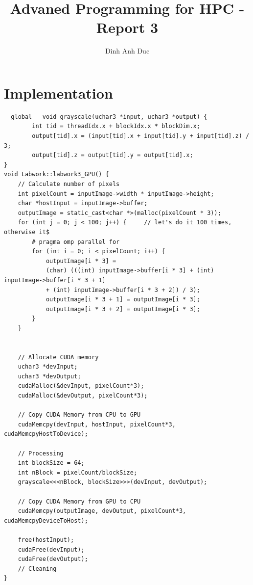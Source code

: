 \documentclass{article}
\title{Advaned Programming for HPC - Report 3}
\author{Dinh Anh Duc}
\begin{document}
\maketitle

\section*{Implementation}
\begin{lstlisting}
__global__ void grayscale(uchar3 *input, uchar3 *output) {
        int tid = threadIdx.x + blockIdx.x * blockDim.x;
        output[tid].x = (input[tid].x + input[tid].y + input[tid].z) / 3;
        output[tid].z = output[tid].y = output[tid].x;
}
void Labwork::labwork3_GPU() {
    // Calculate number of pixels
    int pixelCount = inputImage->width * inputImage->height;
    char *hostInput = inputImage->buffer;
    outputImage = static_cast<char *>(malloc(pixelCount * 3));
    for (int j = 0; j < 100; j++) {     // let's do it 100 times, otherwise it$
        # pragma omp parallel for
        for (int i = 0; i < pixelCount; i++) {
            outputImage[i * 3] = 
            (char) (((int) inputImage->buffer[i * 3] + (int) inputImage->buffer[i * 3 + 1] 
            + (int) inputImage->buffer[i * 3 + 2]) / 3);
            outputImage[i * 3 + 1] = outputImage[i * 3];
            outputImage[i * 3 + 2] = outputImage[i * 3];
        }
    }


    // Allocate CUDA memory
    uchar3 *devInput;
    uchar3 *devOutput;
    cudaMalloc(&devInput, pixelCount*3);
    cudaMalloc(&devOutput, pixelCount*3);

    // Copy CUDA Memory from CPU to GPU
    cudaMemcpy(devInput, hostInput, pixelCount*3, cudaMemcpyHostToDevice);

    // Processing
    int blockSize = 64;
    int nBlock = pixelCount/blockSize;
    grayscale<<<nBlock, blockSize>>>(devInput, devOutput);

    // Copy CUDA Memory from GPU to CPU
    cudaMemcpy(outputImage, devOutput, pixelCount*3, cudaMemcpyDeviceToHost);

    free(hostInput);
    cudaFree(devInput);
    cudaFree(devOutput);
    // Cleaning
}

\end{lstlisting}
\end{document}
